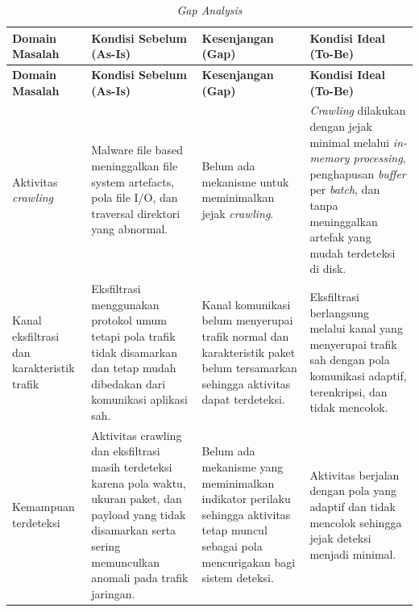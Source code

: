 \begin{longtable}{|p{2cm}|p{3.5cm}|p{3.5cm}|p{3.5cm}|}
\caption{\textit{Gap Analysis}}%
\label{tbl:gap-analysis} \\
\hline
\textbf{Domain Masalah} &
\textbf{Kondisi Sebelum (As-Is)} &
\textbf{Kesenjangan (Gap)} &
\textbf{Kondisi Ideal (To-Be)} \\
\hline
\endfirsthead

\hline
\textbf{Domain Masalah} &
\textbf{Kondisi Sebelum (As-Is)} &
\textbf{Kesenjangan (Gap)} &
\textbf{Kondisi Ideal (To-Be)} \\
\hline
\endhead

\hline
\endfoot

Aktivitas \textit{crawling} &
Malware file based meninggalkan file system artefacts, pola file I/O, dan traversal direktori yang abnormal. &
Belum ada mekanisme untuk meminimalkan jejak \textit{crawling}. &
\textit{Crawling} dilakukan dengan jejak minimal melalui \textit{in-memory processing}, penghapusan \textit{buffer} per \textit{batch}, dan tanpa meninggalkan artefak yang mudah terdeteksi di disk. \\
\hline

Kanal eksfiltrasi dan karakteristik trafik &
Eksfiltrasi menggunakan protokol umum tetapi pola trafik tidak disamarkan dan tetap mudah dibedakan dari komunikasi aplikasi sah. &
Kanal komunikasi belum menyerupai trafik normal dan karakteristik paket belum tersamarkan sehingga aktivitas dapat terdeteksi. &
Eksfiltrasi berlangsung melalui kanal yang menyerupai trafik sah dengan pola komunikasi adaptif, terenkripsi, dan tidak mencolok. \\
\hline

Kemampuan terdeteksi &
Aktivitas crawling dan eksfiltrasi masih terdeteksi karena pola waktu, ukuran paket, dan payload yang tidak disamarkan serta sering memunculkan anomali pada trafik jaringan. &
Belum ada mekanisme yang meminimalkan indikator perilaku sehingga aktivitas tetap muncul sebagai pola mencurigakan bagi sistem deteksi. &
Aktivitas berjalan dengan pola yang adaptif dan tidak mencolok sehingga jejak deteksi menjadi minimal. \\
\hline

\end{longtable}